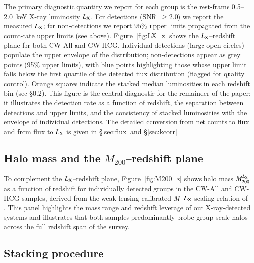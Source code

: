 \documentclass{aa}
\begin{document}
The primary diagnostic quantity we report for each group is the rest-frame 0.5--2.0~keV X-ray luminosity $L_{\rm X}$. For detections (SNR~$\geq 2.0$) we report the measured $L_{\rm X}$; for non-detections we report 95\% upper limits propagated from the count-rate upper limits (see above). Figure~\ref{fig:LX_z} shows the $L_{\rm X}$--redshift plane for both CW-All and CW-HCG. Individual detections (large open circles) populate the upper envelope of the distribution; non-detections appear as grey points (95\% upper limits), with blue points highlighting those whose upper limit falls below the first quartile of the detected flux distribution (flagged for quality control). Orange squares indicate the stacked median luminosities in each redshift bin (see \S\ref{sec:stacking}). This figure is the central diagnostic for the remainder of the paper: it illustrates the detection rate as a function of redshift, the separation between detections and upper limits, and the consistency of stacked luminosities with the envelope of individual detections. The detailed conversion from net counts to flux and from flux to $L_{\rm X}$ is given in \S\ref{sec:flux} and \S\ref{sec:kcorr}.

\subsection{Halo mass and the $M_{200}$--redshift plane}

To complement the $L_{\rm X}$--redshift plane, Figure~\ref{fig:M200_z} shows halo mass $M_{200}^{L_{\rm X}}$ as a function of redshift for individually detected groups in the CW-All and CW-HCG samples, derived from the weak-lensing calibrated $M$--$L_{\rm X}$ scaling relation of \citet{Leauthaud2010}. This panel highlights the mass range and redshift leverage of our X-ray-detected systems and illustrates that both samples predominantly probe group-scale halos across the full redshift span of the survey.

\subsection{Stacking procedure}
\label{sec:stacking}
\end{document}
